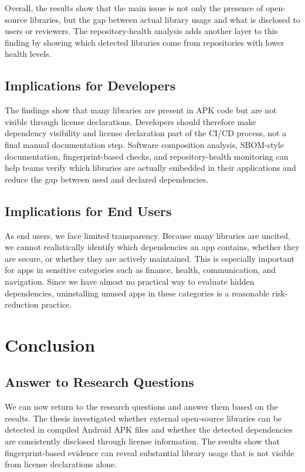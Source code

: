 \documentclass[12pt,a4paper]{report}
\begin{document}
Overall, the results show that the main issue is not only the presence of open-source libraries, but the gap between actual library usage and what is disclosed to users or reviewers. The repository-health analysis adds another layer to this finding by showing which detected libraries come from repositories with lower health levels.

\section{Implications for Developers}
The findings show that many libraries are present in APK code but are not visible through license declarations. Developers should therefore make dependency visibility and license declaration part of the CI/CD process, not a final manual documentation step. Software composition analysis, SBOM-style documentation, fingerprint-based checks, and repository-health monitoring can help teams verify which libraries are actually embedded in their applications and reduce the gap between used and declared dependencies.

\section{Implications for End Users}
As end users, we face limited transparency. Because many libraries are uncited, we cannot realistically identify which dependencies an app contains, whether they are secure, or whether they are actively maintained. This is especially important for apps in sensitive categories such as finance, health, communication, and navigation. Since we have almost no practical way to evaluate hidden dependencies, uninstalling unused apps in these categories is a reasonable risk-reduction practice.

\chapter{Conclusion}
\section{Answer to Research Questions}
We can now return to the research questions and answer them based on the results. The thesis investigated whether external open-source libraries can be detected in compiled Android APK files and whether the detected dependencies are consistently disclosed through license information. The results show that fingerprint-based evidence can reveal substantial library usage that is not visible from license declarations alone.
\end{document}
